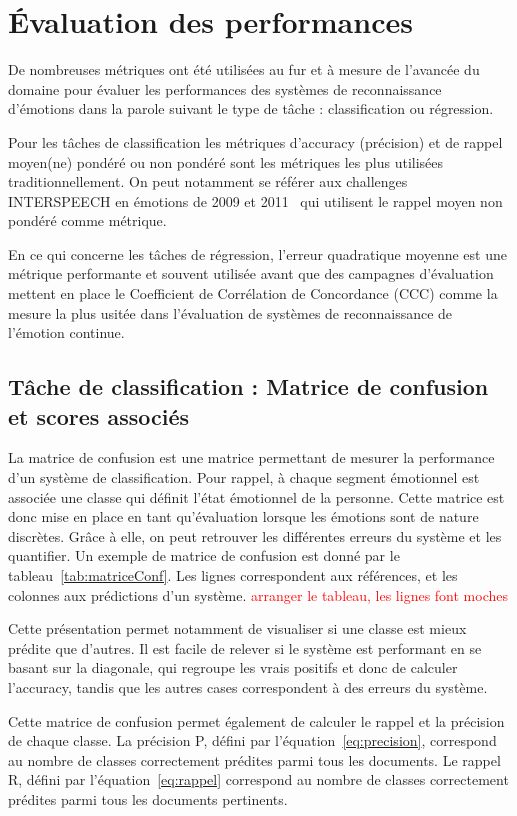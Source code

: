 \section{Évaluation des performances}
De nombreuses métriques ont été utilisées au fur et à mesure de l'avancée du domaine pour évaluer les performances des systèmes de reconnaissance d'émotions dans la parole suivant le type de tâche : classification ou régression.

Pour les tâches de classification les métriques d'accuracy (précision) et de rappel moyen(ne) pondéré ou non pondéré sont les métriques les plus utilisées traditionnellement. On peut notamment se référer aux challenges INTERSPEECH en émotions de 2009 et 2011~\cite{Schuller2009,Schuller2011} qui utilisent le rappel moyen non pondéré comme métrique.

En ce qui concerne les tâches de régression, l'erreur quadratique moyenne est une métrique performante et souvent utilisée avant que des campagnes d'évaluation mettent en place le Coefficient de Corrélation de Concordance (CCC) comme la mesure la plus usitée dans l'évaluation de systèmes de reconnaissance de l'émotion continue.

\subsection{Tâche de classification : Matrice de confusion et scores associés}
La matrice de confusion est une matrice permettant de mesurer la performance d'un système de classification. Pour rappel, à chaque segment émotionnel est associée une classe qui définit l'état émotionnel de la personne. Cette matrice est donc mise en place en tant qu'évaluation lorsque les émotions sont de nature discrètes. Grâce à elle, on peut retrouver les différentes erreurs du système et les quantifier. Un exemple de matrice de confusion est donné par le tableau~\ref{tab:matriceConf}. Les lignes correspondent aux références, et les colonnes aux prédictions d'un système.
\textcolor{red}{arranger le tableau, les lignes font moches}

%

Cette présentation permet notamment de visualiser si une classe est mieux prédite que d'autres. Il est facile de relever si le système est performant en se basant sur la diagonale, qui regroupe les vrais positifs et donc de calculer l'accuracy, tandis que les autres cases correspondent à des erreurs du système.

Cette matrice de confusion permet également de calculer le rappel et la précision de chaque classe. La précision P, défini par l'équation~\ref{eq:precision}, correspond au nombre de classes correctement prédites parmi tous les documents. Le rappel R, défini par l'équation~\ref{eq:rappel} correspond au nombre de classes correctement prédites parmi tous les documents pertinents.

